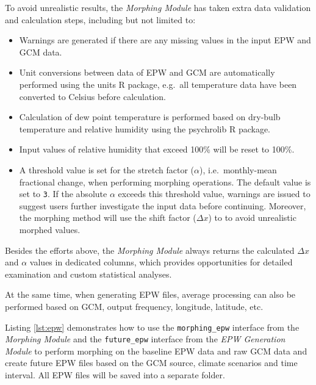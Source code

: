 \documentclass[twocolumn, a4paper,10pt]{article}
\providecommand{\tightlist}{\setlength{\itemsep}{0pt}\setlength{\parskip}{0pt}}
\begin{document}
To avoid unrealistic results, the \emph{Morphing Module} has taken extra data
validation and calculation steps, including but not limited to:

\begin{itemize}
\tightlist
\item
  Warnings are generated if there are any missing values in the input EPW and
  GCM data.
\item
  Unit conversions between data of EPW and GCM are automatically performed using
  the units \citep{pebesma2016measurement} R package, e.g.~all temperature data have
  been converted to Celsius before calculation.
\item
  Calculation of dew point temperature is performed based on dry-bulb
  temperature and relative humidity using the psychrolib \citep{meyer2019psychrolib}
  R package.
\item
  Input values of relative humidity that exceed 100\% will be reset to 100\%.
\item
  A threshold value is set for the stretch factor (\(\alpha\)), i.e.~monthly-mean
  fractional change, when performing morphing operations. The default value is
  set to \texttt{3}. If the absolute \(\alpha\) exceeds this threshold value, warnings
  are issued to suggest users further investigate the input data before
  continuing. Moreover, the morphing method will use the shift factor (\(\Delta x\))
  to to avoid unrealistic morphed values.
\end{itemize}

Besides the efforts above, the \emph{Morphing Module} always returns the calculated
\(\Delta x\) and \(\alpha\) values in dedicated columns, which provides
opportunities for detailed examination and custom statistical analyses.

At the same time, when generating EPW files, average processing can also be
performed based on GCM, output frequency, longitude, latitude, etc.

Listing \ref{lst:epw} demonstrates how to use the \texttt{morphing\_epw} interface from
the \emph{Morphing Module} and the \texttt{future\_epw} interface from the \emph{EPW Generation
Module} to perform morphing on the baseline EPW data and raw GCM data and
create future EPW files based on the GCM source, climate scenarios and time
interval. All EPW files will be saved into a separate folder.
\end{document}
